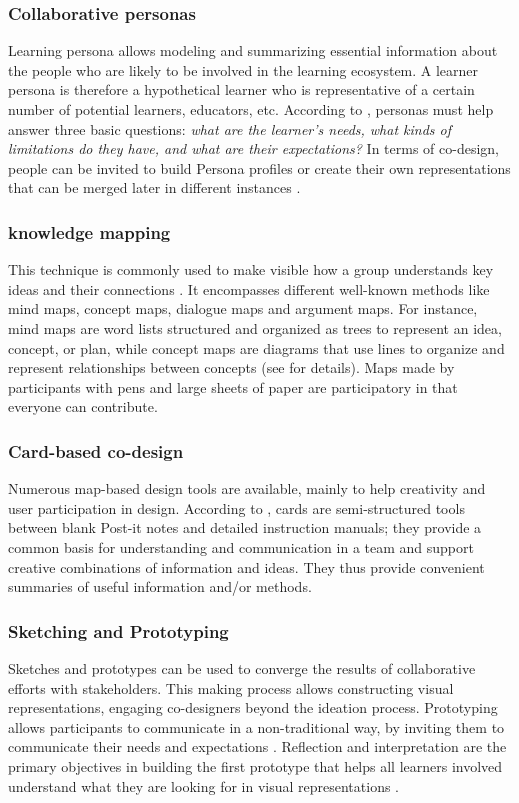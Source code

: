 \documentclass[preprint,12pt]{elsarticle}
\begin{document}
\subsubsection{Collaborative personas}
Learning persona allows modeling and summarizing essential information about the people who are likely to be involved in the learning ecosystem. A learner persona is therefore a hypothetical learner who is representative of a certain number of potential learners, educators, etc.
According to \citet{zhang2016data}, personas must help answer three basic questions: \textit{what are the learner’s needs, what kinds of limitations do they have, and what are their expectations?}
In terms of co-design, people can be invited to build Persona profiles or create their own representations that can be merged later in different instances \cite{prieto2018co}.

\subsubsection{knowledge mapping}
This technique is commonly used to make visible how a group understands key ideas and their connections \cite{prieto2018co}. It encompasses different well-known methods like  mind maps, concept
maps, dialogue maps and argument maps. For instance, mind maps are word lists structured and organized as trees to represent an idea, concept, or plan, while concept maps are diagrams that use lines to organize and represent relationships between concepts \cite{carrillo2017dashboard} (see \cite{okada2008knowledge} for details). Maps made by participants with pens and large sheets of paper are participatory in that everyone can contribute.

\subsubsection{Card-based co-design}
Numerous map-based design tools are available, mainly to help creativity and user participation in design. According to \citet{roy2019card}, cards are semi-structured tools between blank Post-it notes and detailed instruction manuals; they provide a common basis for understanding and communication in a team and support creative combinations of information and ideas. They thus  provide convenient summaries of useful information and/or methods.

\subsubsection{Sketching and Prototyping}
Sketches and prototypes can be used to converge the results of collaborative efforts with stakeholders. This making process allows constructing visual representations, engaging co-designers beyond the ideation process. Prototyping allows participants to communicate in a non-traditional way, by inviting them to communicate their needs and expectations \cite{gaver1999design}.
Reflection and interpretation are the primary objectives in building the first prototype that helps all learners involved understand what they are looking for in visual representations \cite{luckin2013handbook}.
\end{document}
